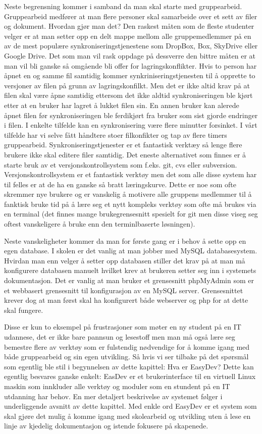 Neste begrensning kommer i samband da man skal starte med gruppearbeid. Gruppearbeid medfører at man flere personer skal samarbeide over et sett av filer og dokument. Hvordan gjør man det? Den raskest måten som de fleste studenter velger er at man setter opp en delt mappe mellom alle gruppemedlemmer på en av de mest populære synkroniseringstjenestene som DropBox, Box, SkyDrive eller Google Drive. Det som man vil rask oppdage på dessverre den bittre måten er at man vil bli ganske så omgående bli offer for lagringskonflikter. Hvis to person har åpnet en og samme fil samtidig kommer synkriniseringstjenesten til å opprette to versjoner av filen på grunn av lagringskonfilkt. Men det er ikke altid krav på at filen skal være åpne samtidig ettersom det ikke aldtid synkroniseringen ble kjørt etter at en bruker har lagret å lukket filen sin. En annen bruker kan alerede åpnet filen før synkroniseringen ble ferdikjørt fra bruker som sist gjorde endringer i filen. I enkelte tilfelde kan en synkronisering være flere minutter forsinket. I vårt tilfelde har vi selve fått håndtere stoer filkonfikter og tap av flere timers gruppearbeid. Synkroniseringstjenester er et fantastisk verktæy så lenge flere brukere ikke skal editere filer samtidig. Det eneste alternativet som finnes er å starte bruk av et versjonskontrollsystem som f.eks. git, cvs eller subversion. Versjonskontrollsystem er et fantastisk verktøy men det som alle disse system har til felles er at de ha en ganske så bratt læringskurve. Dette er noe som ofte skremmer nye brukere og er vanskelig å motivere alle gruppens medlemmer til å fanktisk bruke tid på å lære seg et nytt kompleks verktøy som ofte må brukes via en terminal (det finnes mange brukegrensesnitt spesielt for git men disse viseg seg oftest vanskeligere å bruke enn den  terminlbaserte løsningen).

Neste vanskeligheter kommer da man for første gang er i behov å sette opp en egen database. I skolen er det vanlig at man jobber med MySQL databasesystem. Hvirdan man enn velger å setter opp databasen stiller det krav på at man må konfigurere databasen manuelt hvilket krev at brukeren setter seg inn i systemets dokumentasjon. Det er vanlig at man bruker et grensesnitt phpMyAdmin som er et webbasert grensesnitt til konfigurasjon av en MySQL server. Grensesnittet krever dog at man først skal ha konfigurert både webserver og php for at dette skal fungere.

Disse er kun to eksempel på frustrasjoner som møter en ny student på en IT udannese, det er ikke bare pannsun og lesestoff men man må også lære seg bemestre flere av verktøy som er fulstendig nødvendige for å komme igang med både gruppearbeid og sin egen utvikling. Så hvis vi ser tilbake på det spørsmål som egentlig ble stil i begynnelsen av dette kapittel: Hva er EasyDev? Dette kan egentlig besvares ganske enkelt: EasDev er et brukerinterface til en virtuell Linux maskin som innkluder alle verktøy og moduler som en stundent på en IT utdanning har behov. En mer detaljert beskrivelse av systemet følger i underliggende avsnitt av dette kapittel. Med enkle ord EasyDev er et system som skal gjøre det mulig å komme igang med skolearbeid og utvikling uten å lese en linje av kjedelig dokumentasjon og istende fokusere på skapenede.


